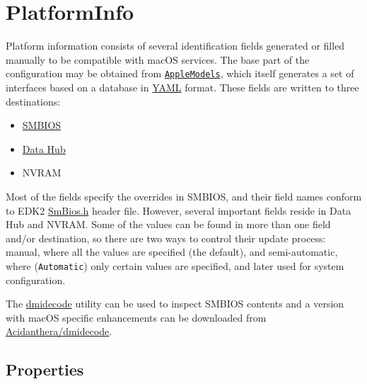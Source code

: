 \documentclass[]{article}
\providecommand{\tightlist}{%
  \setlength{\itemsep}{0pt}\setlength{\parskip}{0pt}}
\begin{document}
\section{PlatformInfo}\label{platforminfo}

Platform information consists of several identification fields
generated or filled manually to be compatible with macOS services. The
base part of the configuration may be obtained from
\href{https://github.com/acidanthera/OpenCorePkg/blob/master/AppleModels}{\texttt{AppleModels}},
which itself generates a set of interfaces based on a database
in \href{https://yaml.org/spec/1.2/spec.html}{YAML} format. These fields
are written to three destinations:

\begin{itemize}
\tightlist
\item
  \href{https://www.dmtf.org/standards/smbios}{SMBIOS}
\item
  \href{https://github.com/acidanthera/OpenCorePkg/blob/master/Include/Intel/Protocol/DataHub.h}{Data
  Hub}
\item
  NVRAM
\end{itemize}

Most of the fields specify the overrides in SMBIOS, and their field
names conform to EDK2
\href{https://github.com/acidanthera/audk/blob/master/MdePkg/Include/IndustryStandard/SmBios.h}{SmBios.h}
header file. However, several important fields reside in Data Hub and
NVRAM. Some of the values can be found in more than one field and/or
destination, so there are two ways to control their update process:
manual, where all the values are specified (the default), and semi-automatic,
where (\texttt{Automatic}) only certain values are specified, and later used
for system configuration.

The \href{http://www.nongnu.org/dmidecode}{dmidecode} utility can be used to inspect
SMBIOS contents and a version with macOS specific enhancements can be downloaded
from \href{https://github.com/acidanthera/dmidecode/releases}{Acidanthera/dmidecode}.

\subsection{Properties}\label{platforminfoprops}
\end{document}
